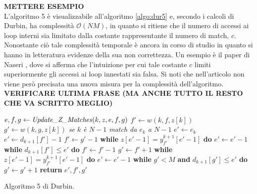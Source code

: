\textbf{METTERE ESEMPIO}\\
L'algoritmo 5 è visualizzabile all'algoritmo \ref{algo:dur5} e, secondo i
calcoli di Durbin, ha complessità $\mathcal{O}(NM)$, in quanto si ritiene che il
numero di accessi ai loop interni sia limitato dalla costante rappresentante il
numero di match, $c$. Nonostante ciò tale complessità temporale è ancora in
corso di studio in quanto si hanno in letteratura evidenze della sua non
correttezza. Un esempio è il paper di Naseri \cite{dpbwt}, dove si afferma che
l'intuizione per cui tale costante $c$ limiti superiormente gli accessi ai loop
innestati sia falsa. Si noti che nell'articolo non viene però precisata una
nuova misura per la complessità dell'algoritmo.
\textbf{VERIFICARE ULTIMA FRASE (MA ANCHE TUTTO IL RESTO CHE VA SCRITTO MEGLIO)}
\begin{algorithm}
  \begin{algorithmic}   
    \State $e,f,g\gets \mbox{\textit{Update\_Z\_Matches}}(k, z, e, f, g)$
    \EndFor
    \EndFunction    
    \State $f'\gets w(k, f, z[k])$
    \State $g'\gets w(k, g, z[k])$
    \Comment\textit{{se $k$ è $N-1$ match da $e_k$ a $N-1$}}
    \State $e'\gets e_k$
    \Else
    \State $e'\gets d_{k+1}[f']-1$
    \State $f'\gets g'-1$
    \State \textbf{while} $z[e'-1]=y_{f'}^{k+1}[e'-1]$ \textbf{do} $e'\gets
    e'-1$
    \State \textbf{while} $d_{k+1}[f']\leq e'$ \textbf{do} $f'\gets f'-1$
    \Else
    \State $g'\gets f'+1$
    \State \textbf{while} $z[e'-1]=y_{f'}^{k+1}[e'-1]$ \textbf{do}  $e'\gets
    e'-1$ 
    \State \textbf{while} $g'<M$ \textbf{and} $d_{k+1}[g']\leq e'$ \textbf{do}
    $g'\gets g'+1$ 
    \EndIf
    \EndIf
    \State \textbf{return} $e',f',g'$
    \EndFunction
  \end{algorithmic}
  \caption{Algoritmo 5 di Durbin.}
  \label{algo:dur5}
\end{algorithm}
